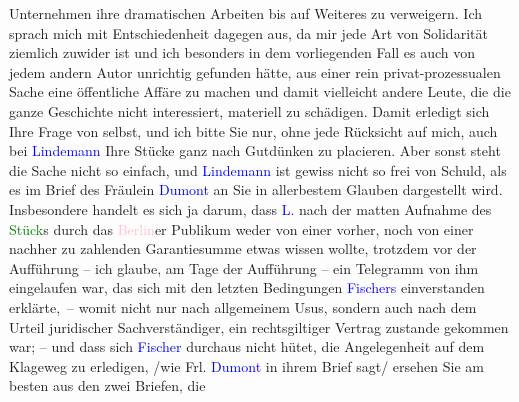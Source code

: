                   Unternehmen\introOben{} ihre dramatischen Arbeiten bis auf Weiteres zu verweigern. Ich
               sprach mich mit Entschiedenheit dagegen aus, da mir jede Art von Solidarität ziemlich
               zuwider ist und ich besonders in dem vorliegenden Fall es auch von jedem andern Autor
               unrichtig gefunden hätte, aus einer rein \introOben{}privat-\introOben{}prozessualen Sache eine \introOben{}öffentliche\introOben{} Affäre zu
               machen und damit vielleicht  andere Leute, die
               die ganze Geschichte nicht interessiert, materiell zu schädigen. Damit erledigt sich
               Ihre Frage von selbst, und ich bit{\pb}te Sie nur, ohne jede
               Rücksicht auf mich, auch bei \textcolor{blue}{Lindemann}{}\ledrightnote{\textcolor{blue}{Gustav Lindemann}} Ihre
               Stücke ganz nach Gutdünken zu placieren.\pend
           \pstart
           Aber sonst steht die Sache nicht so einfach, und \textcolor{blue}{Lindemann}{}\ledrightnote{\textcolor{blue}{Gustav Lindemann}} ist gewiss nicht so frei von Schuld, als es im Brief des Fräulein
                  \textcolor{blue}{Dumont}{}\ledrightnote{\textcolor{blue}{Louise Dumont}} an Sie in allerbestem Glauben
               dargestellt wird.\pend
           \pstart
           Insbesondere handelt es sich ja darum, dass \textcolor{blue}{L.}{}\ledrightnote{\textcolor{blue}{Gustav Lindemann}}
               nach der matten Aufnahme des \textcolor{green}{Stück}{}s durch das \textcolor{pink}{Berlin}{}\ledrightnote{\textcolor{pink}{Berlin}}er Publikum weder
               von einer vorher, noch von einer nachher zu zahlenden Garantiesumme etwas wissen
               wollte, trotzdem vor der Aufführung – ich glaube, am Tage der Aufführung – ein
               Telegramm \introOben{}von ihm\introOben{} eingelaufen war, das sich mit den letzten
               Bedingungen \textcolor{blue}{Fischers}{}\ledrightnote{\textcolor{blue}{Samuel Fischer}} einverstanden erklärte, –
               womit nicht nur nach allgemeinem Usus, sondern auch nach dem Urteil juridischer
               Sachverständiger, ein rechtsgiltiger Vertrag zustande gekommen war; \introOben{}–\introOben{} und dass sich \textcolor{blue}{Fischer}{}\ledrightnote{\textcolor{blue}{Samuel Fischer}}
               durchaus nicht hütet, die Angelegenheit auf dem Klageweg zu erledi{\pb}gen, /wie Frl. \textcolor{blue}{Dumont}{}\ledrightnote{\textcolor{blue}{Louise Dumont}} in ihrem Brief sagt/ ersehen Sie am besten aus den zwei Briefen, die
